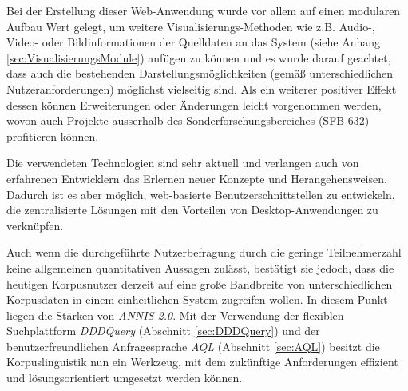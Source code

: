 

Bei der Erstellung dieser Web-Anwendung wurde vor allem auf einen modularen Aufbau Wert gelegt, um weitere Visualisierungs-Methoden wie z.B. Audio-, Video- oder Bildinformationen der Quelldaten an das System (siehe Anhang \ref{sec:VisualisierungsModule}) anfügen zu können und es wurde darauf geachtet, dass auch die bestehenden Darstellungsmöglichkeiten (gemäß unterschiedlichen Nutzeranforderungen) möglichst vielseitig sind. Als ein weiterer positiver Effekt dessen können Erweiterungen oder Änderungen leicht vorgenommen werden, wovon auch Projekte ausserhalb des Sonderforschungsbereiches (SFB 632) profitieren können.


Die verwendeten Technologien sind sehr aktuell und verlangen auch von erfahrenen Entwicklern das Erlernen neuer Konzepte und Herangehensweisen. Dadurch ist es aber möglich, web-basierte Benutzerschnittstellen zu entwickeln, die zentralisierte Lösungen mit den Vorteilen von Desktop-Anwendungen zu verknüpfen.

Auch wenn die durchgeführte Nutzerbefragung durch die geringe Teilnehmerzahl keine allgemeinen quantitativen Aussagen zulässt, bestätigt sie jedoch, dass die heutigen Korpusnutzer derzeit auf eine große Bandbreite von unterschiedlichen Korpusdaten in einem einheitlichen System zugreifen wollen. In diesem Punkt liegen die Stärken von \emph{ANNIS 2.0}. Mit der Verwendung der flexiblen Suchplattform \emph{DDDQuery} (Abschnitt \ref{sec:DDDQuery}) und der benutzerfreundlichen Anfragesprache \emph{AQL} (Abschnitt \ref{sec:AQL}) besitzt die Korpuslinguistik nun ein Werkzeug, mit dem zukünftige Anforderungen effizient und lösungsorientiert umgesetzt werden können.

